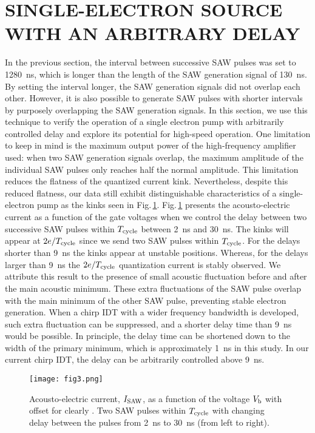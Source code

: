 \documentclass{article}
\begin{document}
\section{SINGLE-ELECTRON SOURCE WITH AN ARBITRARY DELAY}
In the previous section, the interval between successive SAW pulses was set to \SI{1280}{ns}, which is longer than the length of the SAW generation signal of \SI{130}{ns}. By setting the interval longer, the SAW generation signals did not overlap each other. However, it is also possible to generate SAW pulses with shorter intervals by purposely overlapping the SAW generation signals. In this section, we use this technique to verify the operation of a single electron pump with arbitrarily controlled delay and explore its potential for high-speed operation.
One limitation to keep in mind is the maximum output power of the high-frequency amplifier used: when two SAW generation signals overlap, the maximum amplitude of the individual SAW pulses only reaches half the normal amplitude. This limitation reduces the flatness of the quantized current kink. Nevertheless, despite this reduced flatness, our data still exhibit distinguishable characteristics of a single-electron pump as the kinks seen in Fig.\,\ref{fig:Figure3}. Fig.\,\ref{fig:Figure3} presents the acousto-electric current as a function of the gate voltages when we control the delay between two successive SAW pulses within $T_{\rm cycle}$ between \SI{2}{ns} and \SI{30}{ns}. The kinks will appear at $2e/T_{\rm cycle}$ since we send two SAW pulses within $T_{\rm cycle}$.
For the delays shorter than \SI{9}{ns} the kinks appear at unstable positions.
Whereas, for the delays larger than \SI{9}{ns} the $2e/T_{\rm cycle}$ quantization current is stably observed.
We attribute this result to the presence of small acoustic fluctuation before and after the main acoustic minimum. These extra fluctuations of the SAW pulse overlap with the main minimum of the other SAW pulse, preventing stable electron generation. When a chirp IDT with a wider frequency bandwidth is developed, such extra fluctuation can be suppressed, and a shorter delay time than \SI{9}{ns} would be possible. In principle, the delay time can be shortened down to the width of the primary minimum, which is approximately \SI{1}{ns} in this study. In our current chirp IDT, the delay can be arbitrarily controlled above \SI{9}{ns}.

\begin{figure}
\centering
\texttt{[image: fig3.png]}
\caption{\label{fig:Figure3}
 Acousto-electric current, $I_{\rm SAW}$, as a function of the voltage $V_{\rm b}$ with offset for clearly \cite{OffsetFig3}. Two SAW pulses within $T_{\rm cycle}$ with changing delay between the pulses from \SI{2}{ns} to \SI{30}{ns} (from left to right). }
\end{figure}
\end{document}
